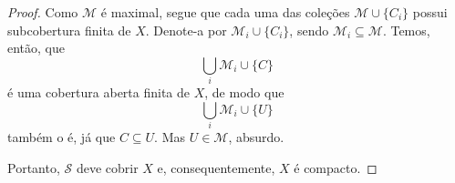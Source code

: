 \begin{proof}
 Como 
 $\mathcal{M}$
 é maximal, segue que cada uma das coleções
 $\mathcal{M} \cup \{ C_i \}$
 possui subcobertura finita de
 $X$.
 Denote-a por
 $\mathcal{M}_i \cup \{ C_i \}$,
 sendo
 $\mathcal{M}_i \subseteq \mathcal{M}$.
 Temos, então, que
 \begin{equation*}
     \bigcup_i \mathcal{M}_i \cup \{ C \}
 \end{equation*}
 é uma cobertura aberta finita de 
 $X$,
 de modo que
 \begin{equation*}
     \bigcup_i \mathcal{M}_i \cup \{ U \}
 \end{equation*}
 também o é, já que
 $C \subseteq U$.
 Mas
 $U \in \mathcal{M}$,
 absurdo.
 
 Portanto,
 $\mathcal{S}$
 deve cobrir 
 $X$
 e, consequentemente,
 $X$
 é compacto.
 \end{proof}
 
     
 
